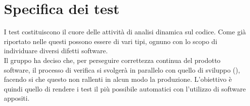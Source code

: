 \section{Specifica dei test}
I test costituiscono il cuore delle attività di analisi dinamica sul codice. Come già riportato nelle \NdPv{} questi possono essere di vari tipi, ognuno con lo scopo di individuare diversi difetti software. \\
Il gruppo \Gruppo{} ha deciso che, per perseguire correttezza continua del prodotto software, il processo di verifica si svolgerà in parallelo con quello di sviluppo (), facendo si che questo non rallenti in alcun modo la produzione. L'obiettivo è quindi quello di rendere i test il più possibile automatici con l'utilizzo di software appositi. 






